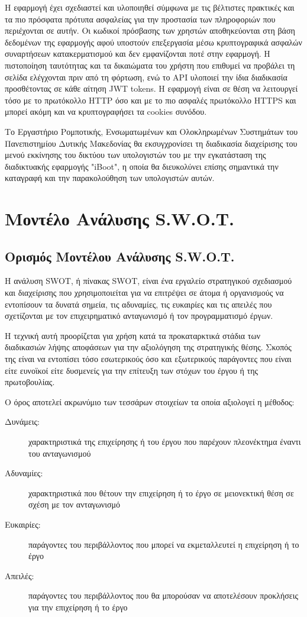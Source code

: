 Η εφαρμογή έχει σχεδιαστεί και υλοποιηθεί σύμφωνα με τις βέλτιστες πρακτικές και τα πιο πρόσφατα πρότυπα ασφαλείας για την προστασία των πληροφοριών που περιέχονται σε αυτήν. Οι κωδικοί πρόσβασης των χρηστών αποθηκεύονται στη βάση δεδομένων της εφαρμογής αφού υποστούν επεξεργασία μέσω κρυπτογραφικά ασφαλών συναρτήσεων κατακερματισμού και δεν εμφανίζονται ποτέ στην εφαρμογή. Η πιστοποίηση ταυτότητας και τα δικαιώματα του χρήστη που επιθυμεί να προβάλει τη σελίδα ελέγχονται πριν από τη φόρτωση, ενώ το API υλοποιεί την ίδια διαδικασία προσθέτοντας σε κάθε αίτηση JWT tokens. Η εφαρμογή είναι σε θέση να λειτουργεί τόσο με το πρωτόκολλο HTTP όσο και με το πιο ασφαλές πρωτόκολλο HTTPS και μπορεί ακόμη και να κρυπτογραφήσει τα cookies συνόδου.

Το Εργαστήριο Ρομποτικής, Ενσωματωμένων και Ολοκληρωμένων Συστημάτων του Πανεπιστημίου Δυτικής Μακεδονίας θα εκσυγχρονίσει τη διαδικασία διαχείρισης του μενού εκκίνησης του δικτύου των υπολογιστών του με την εγκατάσταση της διαδικτυακής εφαρμογής "iBoot", η οποία θα διευκολύνει επίσης σημαντικά την καταγραφή και την παρακολούθηση των υπολογιστών αυτών.

\section{Μοντέλο Ανάλυσης S.W.O.T.}

\subsection{Ορισμός Μοντέλου Ανάλυσης S.W.O.T.}
Η ανάλυση SWOT, ή πίνακας SWOT, είναι ένα εργαλείο στρατηγικού σχεδιασμού και διαχείρισης που χρησιμοποιείται για να επιτρέψει σε άτομα ή οργανισμούς να εντοπίσουν τα δυνατά σημεία, τις αδυναμίες, τις ευκαιρίες και τις απειλές που σχετίζονται με τον επιχειρηματικό ανταγωνισμό ή τον προγραμματισμό έργων.

Η τεχνική αυτή προορίζεται για χρήση κατά τα προκαταρκτικά στάδια των διαδικασιών λήψης αποφάσεων για την αξιολόγηση της στρατηγικής θέσης. Σκοπός της είναι να εντοπίσει τόσο εσωτερικούς όσο και εξωτερικούς παράγοντες που είναι είτε ευνοϊκοί είτε δυσμενείς για την επίτευξη των στόχων του έργου ή της πρωτοβουλίας.

Ο όρος αποτελεί ακρωνύμιο των τεσσάρων στοιχείων τα οποία αξιολογεί η μέθοδος:

\begin{description}
	\item[Δυνάμεις:] χαρακτηριστικά της επιχείρησης ή του έργου που παρέχουν πλεονέκτημα έναντι του ανταγωνισμού
	\item[Αδυναμίες:] χαρακτηριστικά που θέτουν την επιχείρηση ή το έργο σε μειονεκτική θέση σε σχέση με τον ανταγωνισμό
	\item[Ευκαιρίες:] παράγοντες του περιβάλλοντος που μπορεί να εκμεταλλευτεί η επιχείρηση ή το έργο
	\item[Απειλές:] παράγοντες του περιβάλλοντος που θα μπορούσαν να αποτελέσουν προκλήσεις για την επιχείρηση ή το έργο
\end{description}

